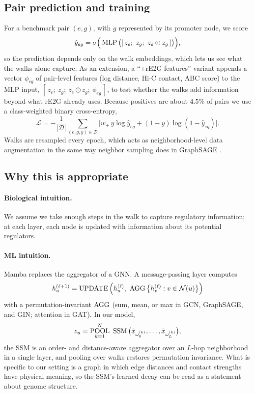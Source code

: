 \subsection{Pair prediction and training}
For a benchmark pair $(e,g)$, with $g$ represented by its promoter node, we score
\begin{equation}\label{eq:pair}
  \hat{y}_{eg}=\sigma\Big(\operatorname{MLP}\big([\,z_e;\ z_g;\ z_e\odot z_g\,]\big)\Big),
\end{equation}
so the prediction depends only on the walk embeddings, which lets us see what the walks alone capture. As an extension, a ``+rE2G features'' variant appends a vector $\phi_{eg}$ of pair-level features (log distance, Hi-C contact, ABC score) to the MLP input, $[\,z_e;\ z_g;\ z_e\odot z_g;\ \phi_{eg}\,]$, to test whether the walks add information beyond what rE2G already uses. Because positives are about $4.5\%$ of pairs we use a class-weighted binary cross-entropy,
\begin{equation}\label{eq:loss}
  \mathcal{L}=-\frac{1}{|\mathcal{D}|}\sum_{(e,g,y)\in\mathcal{D}}
  \Big[w_{+}\,y\log\hat{y}_{eg}+(1-y)\log(1-\hat{y}_{eg})\Big].
\end{equation}
Walks are resampled every epoch, which acts as neighborhood-level data augmentation in the same way neighbor sampling does in GraphSAGE \cite{hamilton2017graphsage}.

\subsection{Why this is appropriate}

\paragraph{Biological intuition.}
We assume we take enough steps in the walk to capture regulatory information; at each layer, each node is updated with information about its potential regulators.

\paragraph{ML intuition.}
Mamba replaces the aggregator of a GNN. A message-passing layer computes
\begin{equation}\label{eq:mp}
  h^{(\ell+1)}_u=\operatorname{UPDATE}\Big(h^{(\ell)}_u,\ \operatorname{AGG}\big\{h^{(\ell)}_v : v\in\mathcal{N}(u)\big\}\Big)
\end{equation}
with a permutation-invariant $\operatorname{AGG}$ (sum, mean, or max in GCN, GraphSAGE, and GIN; attention in GAT). In our model,
\begin{equation}\label{eq:ours}
  z_u=\POOL_{k=1}^{N}\ \SSM\big(\tilde{x}_{\omega^{(k)}_0},\ldots,\tilde{x}_{\omega^{(k)}_L}\big),
\end{equation}
the SSM is an order- and distance-aware aggregator over an $L$-hop neighborhood in a single layer, and pooling over walks restores permutation invariance. What is specific to our setting is a graph in which edge distances and contact strengths have physical meaning, so the SSM's learned decay can be read as a statement about genome structure.

